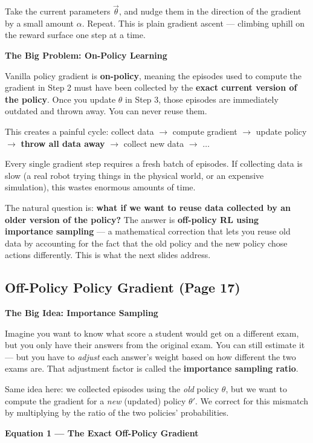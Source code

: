 Take the current parameters $\vec{\theta}$, and nudge them in the direction of the gradient by a
small amount $\alpha$. Repeat. This is plain gradient ascent --- climbing uphill on the reward
surface one step at a time.

\textbf{The Big Problem: On-Policy Learning}

Vanilla policy gradient is \textbf{on-policy}, meaning the episodes used to compute the gradient
in Step 2 must have been collected by the \textbf{exact current version of the policy}. Once you
update $\theta$ in Step 3, those episodes are immediately outdated and thrown away. You can never
reuse them.

This creates a painful cycle: collect data $\to$ compute gradient $\to$ update policy $\to$
\textbf{throw all data away} $\to$ collect new data $\to$ $\ldots$

Every single gradient step requires a fresh batch of episodes. If collecting data is slow (a real
robot trying things in the physical world, or an expensive simulation), this wastes enormous
amounts of time.

The natural question is: \textbf{what if we want to reuse data collected by an older version of
the policy?} The answer is \textbf{off-policy RL using importance sampling} --- a mathematical
correction that lets you reuse old data by accounting for the fact that the old policy and the new
policy chose actions differently. This is what the next slides address.

\subsection{Off-Policy Policy Gradient (Page 17)}

\textbf{The Big Idea: Importance Sampling}

Imagine you want to know what score a student would get on a different exam, but you only have
their answers from the original exam. You can still estimate it --- but you have to \textit{adjust}
each answer's weight based on how different the two exams are. That adjustment factor is called the
\textbf{importance sampling ratio}.

Same idea here: we collected episodes using the \textit{old} policy $\theta$, but we want to
compute the gradient for a \textit{new} (updated) policy $\theta'$. We correct for this mismatch
by multiplying by the ratio of the two policies' probabilities.

\textbf{Equation 1 --- The Exact Off-Policy Gradient}

